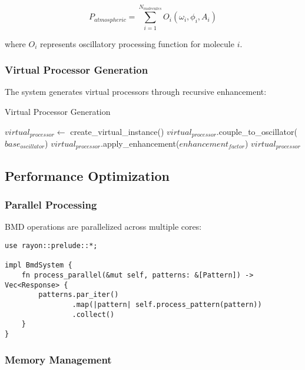 \documentclass[12pt,a4paper]{article}
\begin{document}
\begin{equation}
P_{atmospheric} = \sum_{i=1}^{N_{molecules}} O_i(\omega_i, \phi_i, A_i)
\end{equation}

where $O_i$ represents oscillatory processing function for molecule $i$.

\subsubsection{Virtual Processor Generation}

The system generates virtual processors through recursive enhancement:

\begin{algorithm}
\caption{Virtual Processor Generation}
\begin{algorithmic}
    \State $virtual_{processor} \leftarrow$ create\_virtual\_instance()
    \State $virtual_{processor}$.couple\_to\_oscillator($base_{oscillator}$)
    \State $virtual_{processor}$.apply\_enhancement($enhancement_{factor}$)
    \State \Return $virtual_{processor}$
\EndProcedure
\end{algorithmic}
\end{algorithm}

\subsection{Performance Optimization}

\subsubsection{Parallel Processing}

BMD operations are parallelized across multiple cores:

\begin{lstlisting}[style=ruststyle]
use rayon::prelude::*;

impl BmdSystem {
    fn process_parallel(&mut self, patterns: &[Pattern]) -> Vec<Response> {
        patterns.par_iter()
                .map(|pattern| self.process_pattern(pattern))
                .collect()
    }
}
\end{lstlisting}

\subsubsection{Memory Management}
\end{document}
